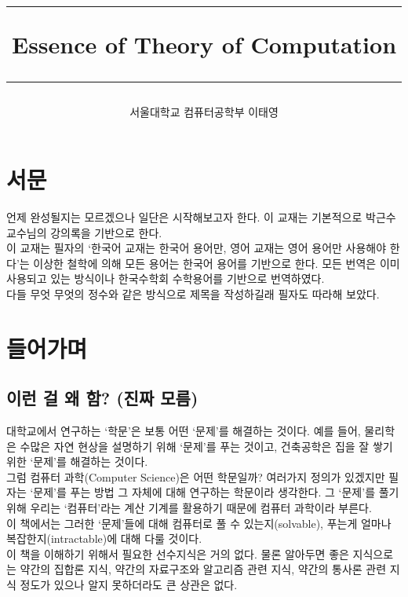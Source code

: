 \documentclass[b5paper, 11pt]{book}
\title{
    \hrule
    \vspace{0.5cm}
    \bfseries\huge Essence of Theory of Computation
    \vspace{0.5cm}
    \hrule}
\author{서울대학교 컴퓨터공학부 이태영}
\theoremstyle{definition}
\begin{document}
\maketitle
\chapter*{서문}
언제 완성될지는 모르겠으나 일단은 시작해보고자 한다. 이 교재는 기본적으로 박근수 교수님의 강의록을 기반으로 한다. \\ 
이 교재는 필자의 `한국어 교재는 한국어 용어만, 영어 교재는 영어 용어만 사용해야 한다'는 이상한 철학에 의해 모든 용어는 한국어 용어를 기반으로 한다. 모든 번역은 이미 사용되고 있는 방식이나 한국수학회 수학용어를 기반으로 번역하였다. \\ 
다들 무엇 무엇의 정수와 같은 방식으로 제목을 작성하길래 필자도 따라해 보았다.
\tableofcontents

\chapter{들어가며}
\section{이런 걸 왜 함? (진짜 모름)}
대학교에서 연구하는 `학문'은 보통 어떤 `문제'를 해결하는 것이다. 예를 들어, 물리학은 수많은 자연 현상을 설명하기 위해 `문제'를 푸는 것이고, 건축공학은
집을 잘 쌓기 위한 `문제'를 해결하는 것이다. \\
그럼 컴퓨터 과학(Computer Science)은 어떤 학문일까? 여러가지 정의가 있겠지만 필자는 `문제'를 푸는 방법 그 자체에 대해 연구하는 학문이라 생각한다. 그 `문제'를 풀기 위해 우리는 `컴퓨터'라는 계산 기계를 활용하기 때문에 컴퓨터 과학이라 부른다.\\
이 책에서는 그러한 `문제'들에 대해 컴퓨터로 풀 수 있는지(solvable), 푸는게 얼마나 복잡한지(intractable)에 대해 다룰 것이다. \\
이 책을 이해하기 위해서 필요한 선수지식은 거의 없다. 물론 알아두면 좋은 지식으로는 약간의 집합론 지식, 약간의 자료구조와 알고리즘 관련 지식, 약간의 통사론 관련 지식 정도가 있으나 알지 못하더라도 큰 상관은 없다.
\end{document}
